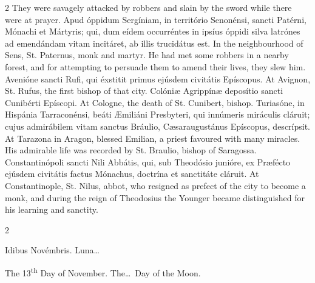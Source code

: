 \begin{paracol}{2}
 They were savagely attacked by robbers and slain by the sword while there 
 were at prayer.
\switchcolumn*
{}
Apud óppidum Sergíniam, 
 in território Senonénsi, sancti Patérni, Mónachi et Mártyris; qui, dum eídem 
 occurréntes in ipsíus óppidi silva latrónes ad emendándam vitam incitáret, 
 ab illis trucidátus est.
\switchcolumn
{}
In the neighbourhood of Sens, St. 
 Paternus, monk and martyr. He had met some robbers in a nearby forest, 
 and for attempting to persuade them to amend their lives, they slew him.
\switchcolumn*
{}
Avenióne sancti Rufi, 
 qui éxstitit primus ejúsdem civitátis Epíscopus.
\switchcolumn
{}
At Avignon, St. Rufus, the first 
 bishop of that city.
\switchcolumn*
{}
Colóniæ Agrippínæ 
 deposítio sancti Cunibérti Epíscopi.
\switchcolumn
{}
At Cologne, the death of St. 
 Cunibert, bishop.
\switchcolumn*
{}
Turiasóne, in Hispánia 
 Tarraconénsi, beáti Æmiliáni Presbyteri, qui innúmeris miráculis cláruit; 
 cujus admirábilem vitam sanctus Bráulio, Cæsaraugustánus Epíscopus, 
 descrípsit.
\switchcolumn
{}
At Tarazona in Aragon, blessed 
 Emilian, a priest favoured with many miracles. His admirable life was 
 recorded by St. Braulio, bishop of Saragossa.
\switchcolumn*
{}
Constantinópoli sancti 
 Nili Abbátis, qui, sub Theodósio junióre, ex Præfécto ejúsdem civitátis 
 factus Mónachus, doctrína et sanctitáte cláruit.
\switchcolumn
{}
At Constantinople, St. Nilus, abbot, 
 who resigned as prefect of the city to become a monk, and during the reign 
 of Theodosius the Younger became distinguished for his learning and 
 sanctity.
\switchcolumn*
{}
\end{paracol}


\begin{paracol}{2}
\begin{center}{\color{gregoriocolor} Idibus Novémbris. 
 Luna\dots\ }\end{center}
\switchcolumn
{}
\begin{center}{\color{gregoriocolor} The 
 13\textsuperscript{th} Day of 
 November. The\dots\ Day of the Moon.}\end{center}
\end{paracol}

